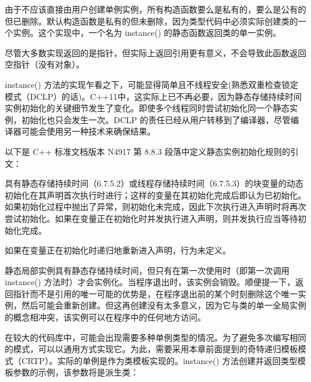
由于不应该直接由用户创建单例实例，所有构造函数要么是私有的，要么是公有的但已删除。默认构造函数是私有的但未删除，因为类型代码中必须实际创建类的一个实例。这个实现中，一个名为 instance() 的静态函数返回类的单一实例。

\begin{myTip}
尽管大多数实现返回的是指针，但实际上返回引用更有意义，不会导致此函数返回空指针（没有对象）。
\end{myTip}

instance() 方法的实现乍看之下，可能显得简单且不线程安全(熟悉双重检查锁定模式（DCLP）的话)。C++11中，这实际上已不再必要，因为静态存储持续时间实例初始化的关键细节发生了变化。即使多个线程同时尝试初始化同一个静态实例，初始化也只会发生一次。DCLP 的责任已经从用户转移到了编译器，尽管编译器可能会使用另一种技术来确保结果。

以下是 C++ 标准文档版本 N4917 第 8.8.3 段落中定义静态实例初始化规则的引文：

\begin{myTip}
具有静态存储持续时间（6.7.5.2）或线程存储持续时间（6.7.5.3）的块变量的动态初始化在其声明首次执行时进行；这样的变量在其初始化完成后即认为已初始化。如果初始化过程中抛出了异常，则初始化未完成，因此下次执行进入声明时将再次尝试初始化。如果在变量正在初始化时并发执行进入声明，则并发执行应当等待初始化完成。

\begin{shell}
\end{shell}

如果在变量正在初始化时递归地重新进入声明，行为未定义。
\end{myTip}

静态局部实例具有静态存储持续时间，但只有在第一次使用时（即第一次调用 instance() 方法时）才会实例化。当程序退出时，该实例会销毁。顺便提一下，返回指针而不是引用的唯一可能的优势是，在程序退出前的某个时刻删除这个唯一实例，然后可能会重新创建。但这再创建没有太多意义，因为它与类的单一全局实例的概念相冲突，该实例可以在程序中的任何地方访问。


在较大的代码库中，可能会出现需要多种单例类型的情况。为了避免多次编写相同的模式，可以以通用方式实现它。为此，需要采用本章前面提到的奇特递归模板模式（CRTP）。实际的单例是作为类模板实现的。instance() 方法创建并返回类型模板参数的示例，该参数将是派生类：

